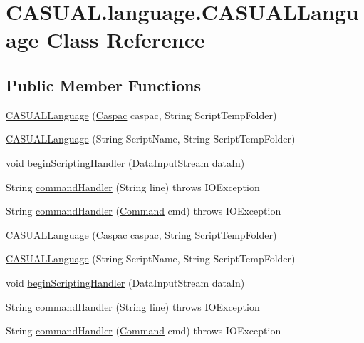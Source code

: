 \hypertarget{class_c_a_s_u_a_l_1_1language_1_1_c_a_s_u_a_l_language}{\section{C\-A\-S\-U\-A\-L.\-language.\-C\-A\-S\-U\-A\-L\-Language Class Reference}
\label{class_c_a_s_u_a_l_1_1language_1_1_c_a_s_u_a_l_language}
}
\subsection*{Public Member Functions}
\begin{DoxyCompactItemize}
\item 
\hyperlink{class_c_a_s_u_a_l_1_1language_1_1_c_a_s_u_a_l_language_a182da0e71337733f5e8578aca0f401ef}{C\-A\-S\-U\-A\-L\-Language} (\hyperlink{class_c_a_s_u_a_l_1_1caspac_1_1_caspac}{Caspac} caspac, String Script\-Temp\-Folder)
\item 
\hyperlink{class_c_a_s_u_a_l_1_1language_1_1_c_a_s_u_a_l_language_a0b9bc89b6b9c36b03c9b6c269ca1f239}{C\-A\-S\-U\-A\-L\-Language} (String Script\-Name, String Script\-Temp\-Folder)
\item 
void \hyperlink{class_c_a_s_u_a_l_1_1language_1_1_c_a_s_u_a_l_language_a90386f91e48889fee1d2f216eb996988}{begin\-Scripting\-Handler} (Data\-Input\-Stream data\-In)
\item 
String \hyperlink{class_c_a_s_u_a_l_1_1language_1_1_c_a_s_u_a_l_language_a3d24aca353156a8435a462fb568f0f5f}{command\-Handler} (String line)  throws I\-O\-Exception
\item 
String \hyperlink{class_c_a_s_u_a_l_1_1language_1_1_c_a_s_u_a_l_language_a93db5a81601bebdd4f9513b4de88f01d}{command\-Handler} (\hyperlink{class_c_a_s_u_a_l_1_1language_1_1_command}{Command} cmd)  throws I\-O\-Exception 
\item 
\hyperlink{class_c_a_s_u_a_l_1_1language_1_1_c_a_s_u_a_l_language_a182da0e71337733f5e8578aca0f401ef}{C\-A\-S\-U\-A\-L\-Language} (\hyperlink{class_c_a_s_u_a_l_1_1caspac_1_1_caspac}{Caspac} caspac, String Script\-Temp\-Folder)
\item 
\hyperlink{class_c_a_s_u_a_l_1_1language_1_1_c_a_s_u_a_l_language_a0b9bc89b6b9c36b03c9b6c269ca1f239}{C\-A\-S\-U\-A\-L\-Language} (String Script\-Name, String Script\-Temp\-Folder)
\item 
void \hyperlink{class_c_a_s_u_a_l_1_1language_1_1_c_a_s_u_a_l_language_a90386f91e48889fee1d2f216eb996988}{begin\-Scripting\-Handler} (Data\-Input\-Stream data\-In)
\item 
String \hyperlink{class_c_a_s_u_a_l_1_1language_1_1_c_a_s_u_a_l_language_a3d24aca353156a8435a462fb568f0f5f}{command\-Handler} (String line)  throws I\-O\-Exception
\item 
String \hyperlink{class_c_a_s_u_a_l_1_1language_1_1_c_a_s_u_a_l_language_a93db5a81601bebdd4f9513b4de88f01d}{command\-Handler} (\hyperlink{class_c_a_s_u_a_l_1_1language_1_1_command}{Command} cmd)  throws I\-O\-Exception 
\end{DoxyCompactItemize}
